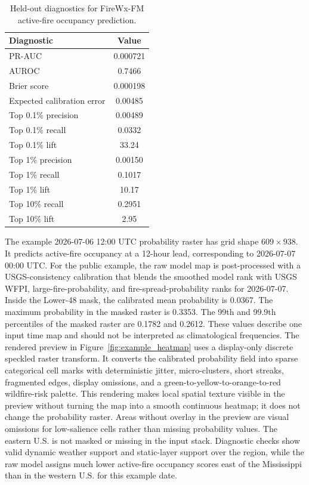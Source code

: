 \documentclass[11pt]{article}
\newcommand{\model}{FireWx-FM}
\begin{document}
\begin{table}[t]
\centering
\small
\caption{Held-out diagnostics for \model{} active-fire occupancy prediction.}
\label{tab:diagnostics}
\begin{tabular}{lc}
\toprule
Diagnostic & Value \\
\midrule
PR-AUC & 0.000721 \\
AUROC & 0.7466 \\
Brier score & 0.000198 \\
Expected calibration error & 0.00485 \\
Top 0.1\% precision & 0.00489 \\
Top 0.1\% recall & 0.0332 \\
Top 0.1\% lift & 33.24 \\
Top 1\% precision & 0.00150 \\
Top 1\% recall & 0.1017 \\
Top 1\% lift & 10.17 \\
Top 10\% recall & 0.2951 \\
Top 10\% lift & 2.95 \\
\bottomrule
\end{tabular}
\end{table}

The example 2026-07-06 12:00 UTC probability raster has grid shape \(609\times938\).
It predicts active-fire occupancy at a 12-hour lead, corresponding to 2026-07-07 00:00 UTC.
For the public example, the raw model map is post-processed with a USGS-consistency calibration that blends the smoothed model rank with USGS WFPI, large-fire-probability, and fire-spread-probability ranks for 2026-07-07.
Inside the Lower-48 mask, the calibrated mean probability is 0.0367.
The maximum probability in the masked raster is 0.3353.
The 99th and 99.9th percentiles of the masked raster are 0.1782 and 0.2612.
These values describe one input time map and should not be interpreted as climatological frequencies.
The rendered preview in Figure~\ref{fig:example_heatmap} uses a display-only discrete speckled raster transform.
It converts the calibrated probability field into sparse categorical cell marks with deterministic jitter, micro-clusters, short streaks, fragmented edges, display omissions, and a green-to-yellow-to-orange-to-red wildfire-risk palette.
This rendering makes local spatial texture visible in the preview without turning the map into a smooth continuous heatmap; it does not change the probability raster.
Areas without overlay in the preview are visual omissions for low-salience cells rather than missing probability values.
The eastern U.S. is not masked or missing in the input stack.
Diagnostic checks show valid dynamic weather support and static-layer support over the region, while the raw model assigns much lower active-fire occupancy scores east of the Mississippi than in the western U.S. for this example date.
\end{document}
